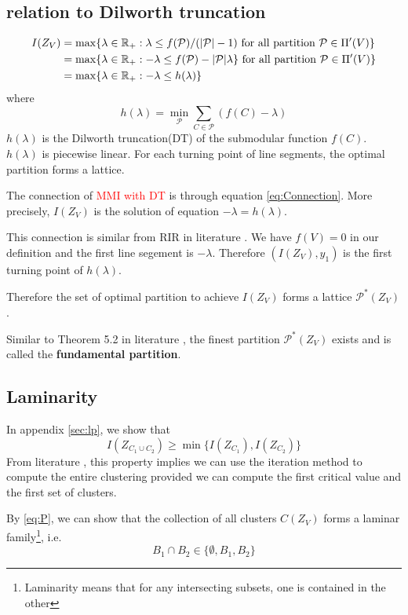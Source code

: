 \documentclass{article}
\def\R{\mathbb{R}}
\def\P{\mathcal{P}}
\DeclarePairedDelimiter\abs{\lvert}{\rvert}
\def\red#1{\textcolor{red}{#1}}
\theoremstyle{definition}
\begin{document}
\subsection{relation to Dilworth truncation}
\begin{align}
I(Z_V) &= \max\{ \lambda \in \R_+: \lambda \leq f(\P)/(\abs{\P} - 1) \text{ for all partition } \P \in \Pi'(V)\} \\
& = \max\{ \lambda \in \R_+:  -\lambda \leq f(\P) - \abs{\P} \lambda \} \text{ for all partition } \P \in \Pi'(V)\} \\
\label{eq:Connection}& = \max\{ \lambda \in \R_+: -\lambda \leq h(\lambda)\}
\end{align}
where 
\begin{equation}\label{eq:hLambda}
h(\lambda) = \min_{\P} \sum_{C\in \P} (f(C)-\lambda)
\end{equation}
$h(\lambda)$ is the Dilworth truncation(DT) of the submodular function $f(C)$. $h(\lambda)$
is piecewise linear. For each turning point of line segments, the optimal partition forms a lattice.

The connection of \red{MMI with DT} is through equation \eqref{eq:Connection}. More precisely, $I(Z_V)$
is the solution of equation $-\lambda = h(\lambda)$.

This connection is similar from RIR in literature \cite{ic}. We have $f(V)=0$ in our definition and the first line segement is $-\lambda$. Therefore
$(I(Z_V),  y_1)$ is the first turning point of $h(\lambda)$.

Therefore the set of optimal partition to achieve $I(Z_V)$ forms a lattice $\P^*(Z_V)$.

Similar to Theorem 5.2 in literature \cite{ska}, the finest partition $\P^*(Z_V)$ exists and is called the 
\textbf{fundamental partition}.

\subsection{Laminarity}
In appendix \ref{sec:lp}, we show that
\begin{equation}\label{eq:P}
I(Z_{C_1 \cup C_2}) \geq \min\{ I(Z_{C_1}), I(Z_{C_2})\}
\end{equation}
From literature \cite{ic}, this property implies we can use the iteration method to compute the entire clustering
provided we can compute the first critical value and the first set of clusters.

By \eqref{eq:P}, we can show that the collection of all clusters $C(Z_V)$ forms a laminar family\footnote{Laminarity means that for any intersecting subsets, one is contained in the other}, i.e.
\begin{equation}
B_1 \cap B_2 \in \{\emptyset, B_1, B_2\}
\end{equation}
\end{document}
